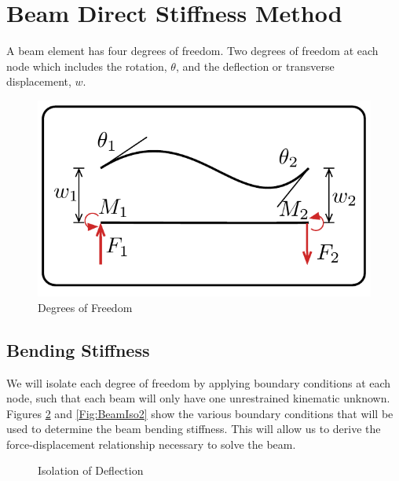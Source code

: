 \section{Beam Direct Stiffness Method}

A beam element has four degrees of freedom. Two degrees of freedom at each node which includes the rotation, $\theta$, and the deflection or transverse displacement, $w$.

\begin{figure}[h]	
	\centerline{
		\includegraphics[width=0.7\columnwidth]{Figures/DeflectionandRotation}
		}
	\caption{Degrees of Freedom}
	\label{fig:DeflectionandRotation}
\end{figure}

\subsection{Bending Stiffness}

We will isolate each degree of freedom by applying boundary conditions at each node, such that each beam will only have one unrestrained kinematic unknown. Figures \ref{Fig:BeamIso1} and \ref{Fig:BeamIso2} show the various boundary conditions that will be used to determine the beam bending stiffness. This will allow us to derive the force-displacement relationship necessary to solve the beam.


\begin{figure}[h]
\begin{center}
\caption{Isolation of Deflection}
\label{Fig:BeamIso1}
\end{center}
\end{figure}

